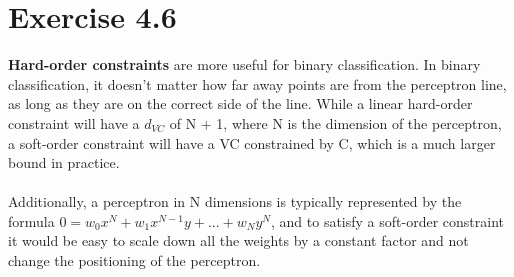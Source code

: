 \documentclass[12pt]{article}
\begin{document}
\section*{Exercise 4.6}
\textbf{Hard-order constraints} are more useful for binary classification. In binary classification, it doesn't matter how far away points are from the perceptron line, as long as they are on the correct side of the line. While a linear hard-order constraint will have a $d_{VC}$ of N + 1, where N is the dimension of the perceptron, a soft-order constraint will have a VC constrained by C, which is a much larger bound in practice.
\\ \\ Additionally, a perceptron in N dimensions is typically represented by the formula $0 = w_0 x^N + w_1 x^{N-1}y + ... + w_N y^N$, and to satisfy a soft-order constraint it would be easy to scale down all the weights by a constant factor and not change the positioning of the perceptron.
\end{document}
